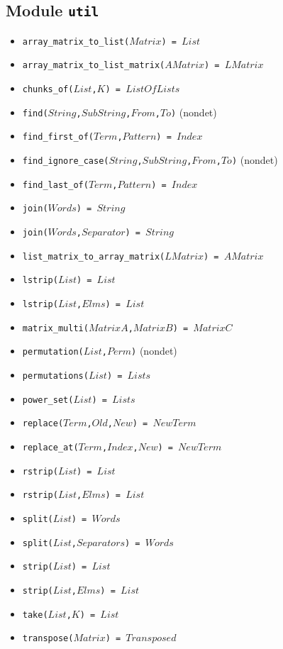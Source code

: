 \documentclass[10pt]{article}
\newcommand{\ignore}[1]{}
\begin{document}
\begin{multicols}{2}
\section*{Module \texttt{util}}
\begin{scriptsize}
\begin{itemize}
    \item \texttt{array\_matrix\_to\_list($Matrix$) = $List$}
    \item \texttt{array\_matrix\_to\_list\_matrix($AMatrix$) = $LMatrix$}
    \item \texttt{chunks\_of($List$,$K$) = $ListOfLists$}
    \item \texttt{find($String$,$SubString$,$From$,$To$)} (nondet)
    \item \texttt{find\_first\_of($Term$,$Pattern$) = $Index$}
    \item \texttt{find\_ignore\_case($String$,$SubString$,$From$,$To$)} (nondet)
    \item \texttt{find\_last\_of($Term$,$Pattern$) = $Index$}
    \item \texttt{join($Words$) = $String$}
    \item \texttt{join($Words$,$Separator$) = $String$}
    \item \texttt{list\_matrix\_to\_array\_matrix($LMatrix$) = $AMatrix$} 
    \item \texttt{lstrip($List$) = $List$ }
    \item \texttt{lstrip($List$,$Elms$) = $List$ }
    \item \texttt{matrix\_multi($MatrixA$,$MatrixB$) = $MatrixC$}
    \item \texttt{permutation($List$,$Perm$)} (nondet)
    \item \texttt{permutations($List$) = $Lists$}
    \item \texttt{power\_set($List$) = $Lists$}
    \item \texttt{replace($Term$,$Old$,$New$) = $NewTerm$}
    \item \texttt{replace\_at($Term$,$Index$,$New$) = $NewTerm$}
    \item \texttt{rstrip($List$) = $List$ } 
    \item \texttt{rstrip($List$,$Elms$) = $List$ }
    \item \texttt{split($List$) = $Words$ } 
    \item \texttt{split($List$,$Separators$) = $Words$ }
    \item \texttt{strip($List$) = $List$ }
    \item \texttt{strip($List$,$Elms$) = $List$ } 
    \item \texttt{take($List$,$K$) = $List$} 
    \item \texttt{transpose($Matrix$) = $Transposed$}
\end{itemize}
\end{scriptsize}
\ignore{
}
\end{multicols}
\end{document}
